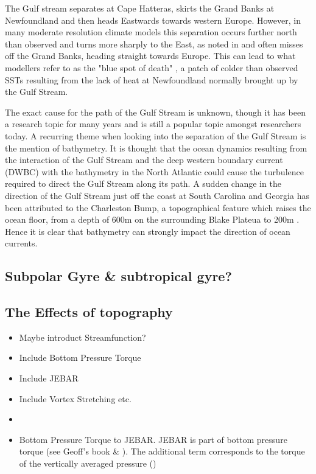 \documentclass[..\EOYR.tex]{subfiles}
\begin{document}
The Gulf stream separates at Cape Hatteras, skirts the Grand Banks at Newfoundland and then heads Eastwards towards western Europe. However, in many moderate resolution climate models this separation occurs further north than observed and turns more sharply to the East, as noted in \citep{Hurlburt2008} and often misses off the Grand Banks, heading straight towards Europe. This can lead to what modellers refer to as the "blue spot of death" \citep{Gnanadesikan2007}, a patch of colder than observed SSTs resulting from the lack of heat at Newfoundland normally brought up by the Gulf Stream.

The exact cause for the path of the Gulf Stream is unknown, though it has been a research topic for many years and is still a popular topic amongst researchers today. A recurring theme when looking into the separation of the Gulf Stream is the mention of bathymetry. It is thought \citep{Gula2014}\citep{NaveiraGarabato2013}\citep{Nikurashin2012a} that the ocean dynamics resulting from the interaction of the Gulf Stream and the deep western boundary current (DWBC) with the bathymetry in the North Atlantic could cause the turbulence required to direct the Gulf Stream along its path. A sudden change in the direction of the Gulf Stream just off the coast at South Carolina and Georgia has been attributed to the Charleston Bump, a topographical feature which raises the ocean floor, from a depth of 600m on the surrounding Blake Plateua to 200m \citep{Gula2014}. Hence it is clear that bathymetry can strongly impact the direction of ocean currents.


\subsection{Subpolar Gyre \& subtropical gyre?}

\subsection{The Effects of topography}
\begin{itemize}
    \item Maybe introduct Streamfunction?
    \item Include Bottom Pressure Torque
    \item Include JEBAR
    \item Include Vortex Stretching etc. \citep{Zhang2007}
    \item \citep{Bell1999}
    \item Bottom Pressure Torque to JEBAR. JEBAR is part of bottom pressure torque (see Geoff's book \& \citep{Greatbatch1991}). The additional term corresponds to the torque of the vertically averaged pressure (\citep{Greatbatch1991})
\end{itemize}
\end{document}
